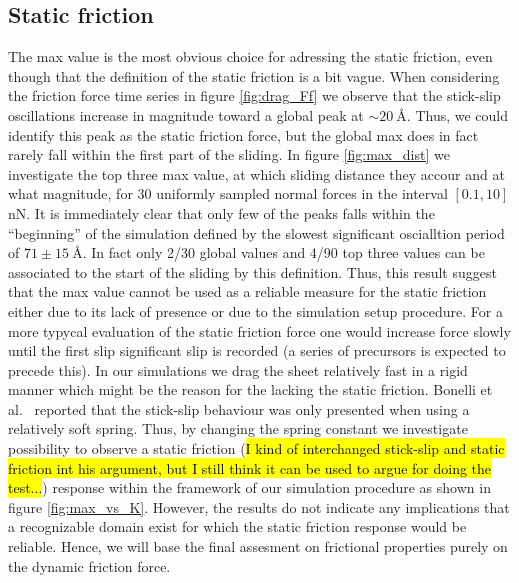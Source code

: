 \subsection{Static friction} 
The max value is the most obvious choice for adressing the static friction, even
though that the definition of the static friction is a bit vague. When
considering the friction force time series in figure \ref{fig:drag_Ff} we
observe that the stick-slip oscillations increase in magnitude toward a global
peak at $\sim \SI{20}{\text{Å}}$. Thus, we could identify this peak as the
static friction force, but the global max does in fact rarely fall within the
first part of the sliding. In figure \ref{fig:max_dist} we investigate the top
three max value, at which sliding distance they accour and at what magnitude,
for 30 uniformly sampled normal forces in the interval $[0.1, 10]$ nN. It is
immediately clear that only few of the peaks falls within the ``beginning'' of
the simulation defined by the slowest significant oscialltion period of $71\pm
\SI{15}{\text{Å}}$. In fact only 2/30 global values and 4/90 top three values
can be associated to the start of the sliding by this definition. Thus, this
result suggest that the max value cannot be used as a reliable measure for the
static friction either due to its lack of presence or due to the simulation
setup procedure. For a more typycal evaluation of the static friction force one
would increase force slowly until the first slip significant slip is recorded (a
series of precursors is expected to precede this). In our simulations we drag
the sheet relatively fast in a rigid manner which might be the reason for the lacking the static friction. Bonelli et al.\ \cite{bonelli_atomistic_2009} reported that the stick-slip behaviour was only presented when using a relatively soft spring. Thus, by changing the spring constant we investigate possibility to observe a static friction (\hl{I kind of interchanged stick-slip and static friction int his argument, but I still think it can be used to argue for doing the test...}) response within the framework of our simulation procedure as shown in
figure \ref{fig:max_vs_K}. However, the results do not indicate any implications
that a recognizable domain exist for which the static friction response would be
reliable. Hence, we will base the final assesment on frictional properties
purely on the dynamic friction force. 


